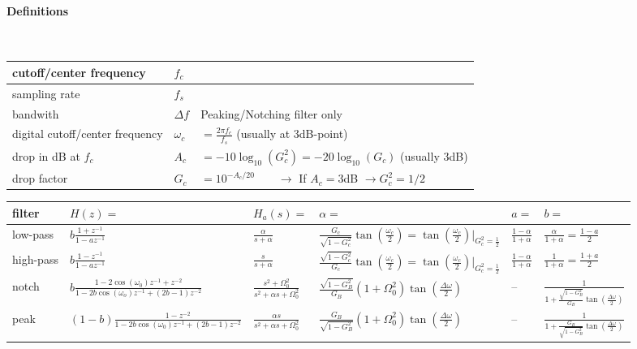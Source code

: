 \paragraph{Definitions}~\\
\begin{tabular}{|l|l|l|}
	\hline
	cutoff/center frequency & $f_c$ &
	\\ \hline
	sampling rate & $f_s$ &
	\\ \hline
	bandwith & $\Delta f$ & Peaking/Notching filter only
	\\ \hline
	digital cutoff/center frequency & $\omega_c$ & $ = \frac{2\pi f_c}{f_s}$ \qquad (usually at 3dB-point)
	\\ \hline
	drop in dB at $f_c$ & $A_c$ & $= -10\log_{10}(G_c^2) = -20\log_{10}(G_c)$ \qquad (usually 3dB)
	\\ \hline
	drop factor & $G_c$ & $=10^{-A_c/20} \qquad \longrightarrow $ If $A_c = 3$dB $\rightarrow G_c^2 = 1/2$
	\\ \hline
\end{tabular}
\vfill
\begin{tabularx}{\textwidth}{|X|l|l|l|l|l|}
	\hline
	\textbf{filter} & $H(z) = $ & $H_a(s) = $ & $\alpha = $ & $a=$ & $b=$
	\\ \hline
	low-pass	&
	$b\frac{1 + z^{-1}}{1 - a z^{-1}}$ &
	$\frac{\alpha}{s + \alpha}$	&
	$ \frac{G_c}{\sqrt{1-G_c^2}}\tan\left(\frac{\omega_c}{2}\right)
	= \tan\left(\frac{\omega_c}{2}\right)\vert_{G_c^2 = \frac{1}{2}}$&
	$\frac{1 - \alpha}{1 + \alpha}$ &
	$\frac{\alpha}{1 + \alpha} = \frac{1 - a}{2}$	
	\\ \hline
	high-pass &
	$b\frac{1 - z^{-1}}{1 - a z^{-1}}$ &
	$\frac{s}{s + \alpha}$ &
	$\frac{\sqrt{1-G_c^2}}{G_c}\tan\left(\frac{\omega_c}{2}\right)
	=\tan\left(\frac{\omega_c}{2}\right)\vert_{G_c^2 = \frac{1}{2}}$&
	$\frac{1-\alpha}{1+\alpha}$&
	$\frac{1}{1+\alpha} = \frac{1 + a}{2}$
	\\ \hline
	notch &
	$b\frac{1-2\cos(\omega_0) z^{-1} + z^{-2}}{1 -2b \cos(\omega_o) z^{-1} + (2b-1)z^{-2}}$&
	$\frac{s^2 + \Omega_0^2}{s^2+\alpha s + \Omega_0^2}$&
	$\frac{\sqrt{1-G_B^2}}{G_B}(1+\Omega_0^2)\tan\left(\frac{\Delta\omega}{2}\right)$&
	--&
	$\frac{1}{1+\frac{\sqrt{1-G_B^2}}{G_B}\tan\left(\frac{\Delta\omega}{2}\right)}$
	\\ \hline
	peak &
	$(1-b)\frac{1-z^{-2}}{1-2b\cos(\omega_0)z^{-1} + (2b-1)z^{-2}}$&
	$\frac{\alpha s}{s^2 + \alpha s + \Omega_0^2}$&
	$\frac{G_B}{\sqrt{1-G_B^2}}(1+\Omega_0^2)\tan\left(\frac{\Delta\omega}{2}\right)$&
	--&
	$\frac{1}{1+\frac{G_B}{\sqrt{1-G_B^2}}\tan\left(\frac{\Delta\omega}{2}\right)}$
	\\ \hline
\end{tabularx}

